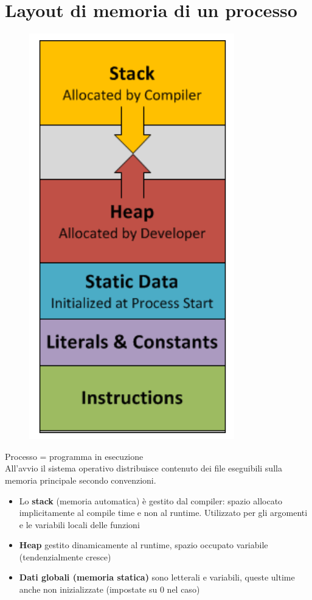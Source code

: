 \documentclass[10pt, oneside]{book}
\begin{document}
\section{Layout di memoria di un processo}
\begin{figure}[h!]
\centering
\includegraphics[scale=0.6]{stack.png}
\end{figure}
Processo = programma in esecuzione\\
All'avvio il sistema operativo distribuisce contenuto dei file eseguibili sulla memoria principale secondo convenzioni.
\begin{itemize}
\item Lo \textbf{stack} (memoria automatica) è gestito dal compiler: spazio allocato implicitamente al compile time e non al runtime. Utilizzato per gli argomenti e le variabili locali delle funzioni 
\item \textbf{Heap} gestito dinamicamente al runtime, spazio occupato variabile (tendenzialmente cresce)
\item \textbf{Dati globali (memoria statica)} sono letterali e variabili, queste ultime anche non inizializzate (impostate su 0 nel caso)
\end{itemize}
\end{document}
